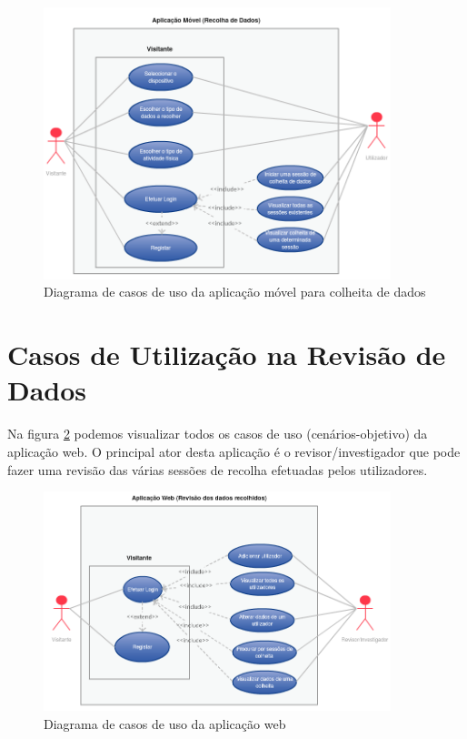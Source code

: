 \begin{figure}[H]
  \centering
  \includegraphics[width=0.9\textwidth]{imgs/app-and-usecase.PNG}
  \caption[Diagrama de casos de uso da aplicação móvel para colheita de dados]{Diagrama de casos de uso da aplicação móvel para colheita de dados}
  
  \label{f:usecaseandroidapp}
\end{figure}


\section{Casos de Utilização na Revisão de Dados}

Na figura \ref{f:usecasewebapp} podemos visualizar todos os casos de uso (cenários-objetivo) da aplicação web. O principal ator desta aplicação é o revisor/investigador que pode fazer uma revisão das várias sessões de recolha efetuadas pelos utilizadores.

\begin{figure}[H]
  \centering
  \includegraphics[width=0.9\textwidth]{imgs/app-web-usecase.PNG}
  \caption[Diagrama de casos de uso da aplicação web]{Diagrama de casos de uso da aplicação web}
  
  \label{f:usecasewebapp}
\end{figure}

\cleardoublepage